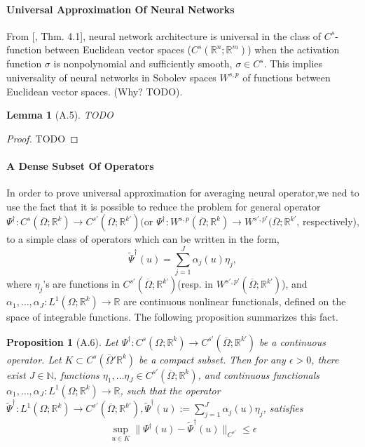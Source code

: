 \documentclass[reqno]{amsart}
\theoremstyle{plain}
\newtheorem{lem}{Lemma}
\newtheorem{prop}{Proposition}
\theoremstyle{definition}
\newcommand{\bb}[1]{\mathbb{#1}}
\begin{document}
\paragraph{\bf Universal Approximation Of Neural Networks}
From [\cite{AP1999}, Thm. 4.1], neural network architecture is universal in the class of $C^s$- function between Euclidean vector spaces ($C^s(\bb R^n; \bb R^m)$) when the activation function $\sigma$ is nonpolynomial and sufficiently smooth, $\sigma \in C^s$. This implies universality of neural networks in Sobolev spaces $W^{s,p}$ of functions between Euclidean vector spaces. (Why? TODO).
\begin{lem}[A.5] TODO
\end{lem}
\begin{proof}
    TODO
\end{proof}
\paragraph{\bf A Dense Subset Of Operators}
In order to prove universal approximation for averaging neural operator,we ned to use the fact that it is possible to reduce the problem for general operator $\Psi^\dag :C^s(\overline{\Omega};\bb R^k) \to C^{s'}(\overline{\Omega};\bb R^{k'})($or $\Psi^\dag :W^{s,p}(\overline{\Omega};\bb R^k) \to W^{s',p'}(\overline{\Omega};\bb R^{k'}$, respectively), to a simple class of operators which can be written in the form,
$$ \tilde{\Psi}^\dag(u) = \sum\limits_{j=1}^{J}\alpha_j(u)\eta_j,$$
where $\eta_j$'s are functions in $C^{s'}(\overline{\Omega};\bb R^{k'})$(resp. in $W^{s',p'}(\overline{\Omega};\bb R^{k'})$), and $\alpha_1,\dots,\alpha_J:L^1(\Omega;\bb R^k) \to \bb R$ are continuous nonlinear functionals, defined on the space of integrable functions. The following proposition summarizes this fact.
\begin{prop}[A.6]
    Let $\Psi^\dag : C^s(\Omega;\bb R^k) \to C^{s'}(\overline{\Omega};\bb R^{k'})$ be a continuous operator. Let $K \subset C^s(\overline{\Omega}'\bb R^k)$ be a compact subset. Then for any $\epsilon > 0$, there exist $J \in \bb N$, functions $\eta_1,\dots \eta_J \in C^{s'}(\overline{\Omega};\bb R^k)$, and continuous functionals $\alpha_1, \dots, \alpha_J:L^1(\Omega;\bb R^k) \to \bb R$, such that the operator $\tilde{\Psi}^\dag : L^1(\Omega;\bb R^k) \to C^{s'}(\overline{\Omega};\bb R^{k'}), \tilde{\Psi}^\dag(u) := \sum\limits_{j=1}^{J}\alpha_j(u)\eta_j$, satisfies
    $$ \sup\limits_{u \in K}\|\Psi^\dag(u) - \tilde{\Psi}^\dag(u)\|_{C^{s'}} \leq \epsilon$$
\end{prop}
\end{document}

